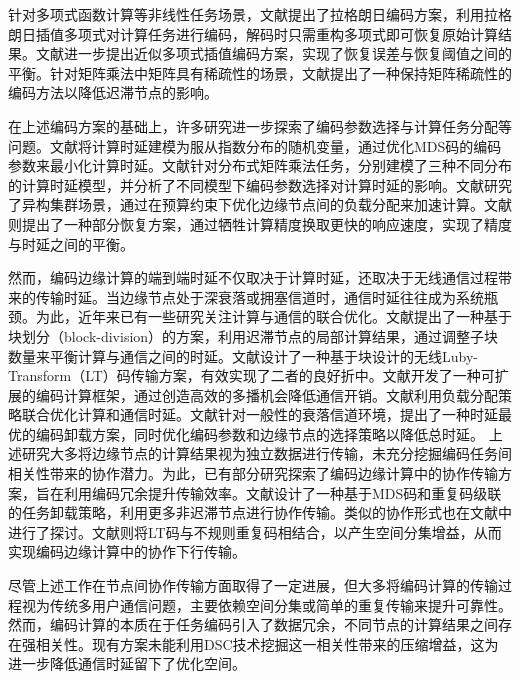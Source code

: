 针对多项式函数计算等非线性任务场景，文献\cite{yu2019lagrange}提出了拉格朗日编码方案，利用拉格朗日插值多项式对计算任务进行编码，解码时只需重构多项式即可恢复原始计算结果。文献\cite{jahani2022berrut}进一步提出近似多项式插值编码方案，实现了恢复误差与恢复阈值之间的平衡。针对矩阵乘法中矩阵具有稀疏性的场景，文献\cite{10633712}提出了一种保持矩阵稀疏性的编码方法以降低迟滞节点的影响。

在上述编码方案的基础上，许多研究进一步探索了编码参数选择与计算任务分配等问题。文献\cite{8002642}将计算时延建模为服从指数分布的随机变量，通过优化MDS码的编码参数来最小化计算时延。文献\cite{peng2020diversity}针对分布式矩阵乘法任务，分别建模了三种不同分布的计算时延模型，并分析了不同模型下编码参数选择对计算时延的影响。文献\cite{8663353}研究了异构集群场景，通过在预算约束下优化边缘节点间的负载分配来加速计算。文献\cite{9641837}则提出了一种部分恢复方案，通过牺牲计算精度换取更快的响应速度，实现了精度与时延之间的平衡。

然而，编码边缘计算的端到端时延不仅取决于计算时延，还取决于无线通信过程带来的传输时延。当边缘节点处于深衰落或拥塞信道时，通信时延往往成为系统瓶颈。为此，近年来已有一些研究关注计算与通信的联合优化。文献\cite{9606237}提出了一种基于块划分（block-division）的方案，利用迟滞节点的局部计算结果，通过调整子块数量来平衡计算与通信之间的时延。文献\cite{9820783}设计了一种基于块设计的无线Luby-Transform（LT）码传输方案，有效实现了二者的良好折中。文献\cite{7935426,8051074}开发了一种可扩展的编码计算框架，通过创造高效的多播机会降低通信开销。文献\cite{9046826}利用负载分配策略联合优化计算和通信时延。文献\cite{9829189}针对一般性的衰落信道环境，提出了一种时延最优的编码卸载方案，同时优化编码参数和边缘节点的选择策略以降低总时延。
上述研究大多将边缘节点的计算结果视为独立数据进行传输，未充分挖掘编码任务间相关性带来的协作潜力。为此，已有部分研究探索了编码边缘计算中的协作传输方案，旨在利用编码冗余提升传输效率。文献\cite{9328810}设计了一种基于MDS码和重复码级联的任务卸载策略，利用更多非迟滞节点进行协作传输。类似的协作形式也在文献\cite{8691770,9062599}中进行了探讨。文献\cite{9562193}则将LT码与不规则重复码相结合，以产生空间分集增益，从而实现编码边缘计算中的协作下行传输。

尽管上述工作在节点间协作传输方面取得了一定进展，但大多将编码计算的传输过程视为传统多用户通信问题，主要依赖空间分集或简单的重复传输来提升可靠性。然而，编码计算的本质在于任务编码引入了数据冗余，不同节点的计算结果之间存在强相关性。现有方案未能利用DSC技术挖掘这一相关性带来的压缩增益，这为进一步降低通信时延留下了优化空间。


